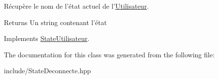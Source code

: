 Récupère le nom de l'état actuel de l'\hyperlink{classUtilisateur}{Utilisateur}. 

\begin{DoxyReturn}{Returns}
Un string contenant l'état 
\end{DoxyReturn}


Implements \hyperlink{classStateUtilisateur_aa0905985b352d22fd18ecbfae5d319a8}{State\-Utilisateur}.



The documentation for this class was generated from the following file\-:\begin{DoxyCompactItemize}
\item 
include/State\-Deconnecte.\-hpp\end{DoxyCompactItemize}
